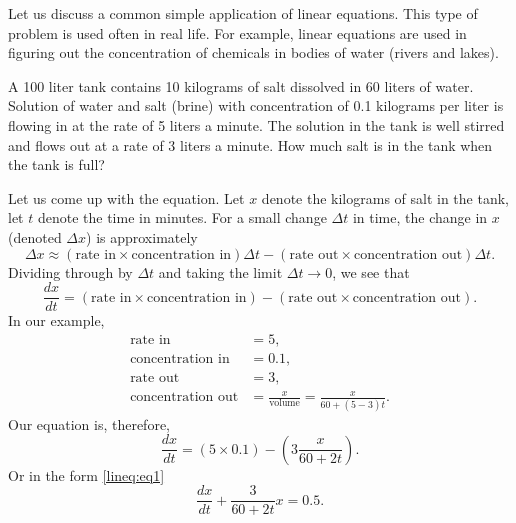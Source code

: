 \begin{example}
Let us discuss a common
simple application of linear equations.
This type of 
problem is used often in real life.
For example, linear equations are used in
figuring out the concentration of
chemicals in bodies of water (rivers and lakes).

\begin{mywrapfigsimp}{1.60in}{1.65in}
\noindent
{}
\end{mywrapfigsimp}
A 100 liter tank contains 10 kilograms of salt dissolved in 60 liters of
water.  Solution of water and salt (brine) with concentration of 0.1
kilograms per
liter is flowing in at the rate of 5 liters a minute.  The solution
in the tank is well stirred and flows out at a rate of 3 liters a minute.
How much salt is in the tank when the tank is full?

Let us come up with the equation.  Let $x$ denote the kilograms of salt in the tank,
let $t$ denote the time in minutes.  For a small change $\Delta t$ in
time, the change in $x$ (denoted $\Delta x$) is approximately
\begin{equation*}
\Delta x \approx
(\text{rate in} \times \text{concentration in}) \Delta t - 
(\text{rate out} \times \text{concentration out}) \Delta t .
\end{equation*}
Dividing through by $\Delta t$ and
taking the limit $\Delta t \to 0$, we see that
\begin{equation*}
\frac{dx}{dt} =
(\text{rate in} \times \text{concentration in})  - 
(\text{rate out} \times \text{concentration out}) .
\end{equation*}
In our example,
\begin{align*}
\text{rate in} &= 5 , \\
\text{concentration in} &= 0.1 , \\
\text{rate out} &= 3 , \\
\text{concentration out} &= \frac{x}{\text{volume}} = \frac{x}{60+(5-3)t} .
\end{align*}
Our equation is, therefore,
\begin{equation*}
\frac{dx}{dt} =
(5 \times 0.1)  - 
\left(3 \frac{x}{60+2t}\right) .
\end{equation*}
Or in the form \eqref{lineq:eq1}
\begin{equation*}
\frac{dx}{dt} +
\frac{3}{60+2t} x
=
0.5 .
\end{equation*}


\end{example}
